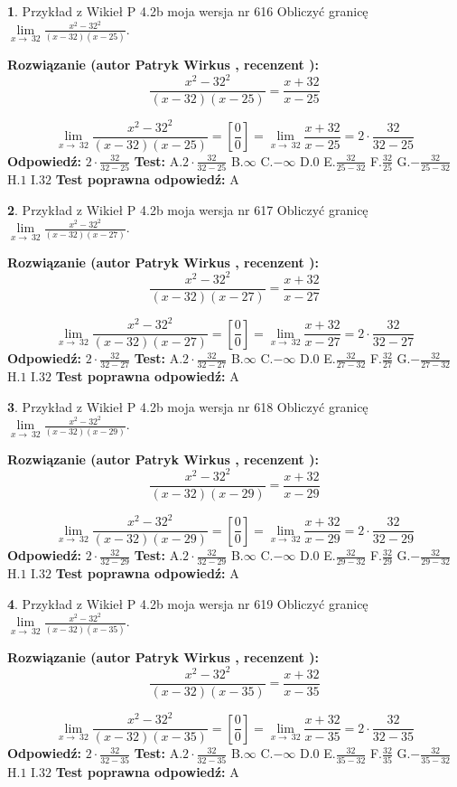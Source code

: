 \documentclass[12pt, a4paper]{article}
\theoremstyle{definition} %
\newtheorem{zad}{}
\newcommand{\zadStart}[1]{\begin{zad}#1\newline}
\newcommand{\zadStop}{\end{zad}}
\newcommand{\rozwStart}[2]{\noindent \textbf{Rozwiązanie (autor #1 , recenzent #2): }\newline}
\newcommand{\rozwStop}{\newline}
\newcommand{\odpStart}{\noindent \textbf{Odpowiedź:}\newline}
\newcommand{\odpStop}{\newline}
\newcommand{\testStart}{\noindent \textbf{Test:}\newline}
\newcommand{\testStop}{\newline}
\newcommand{\kluczStart}{\noindent \textbf{Test poprawna odpowiedź:}\newline}
\newcommand{\kluczStop}{\newline}
\begin{document}
\zadStart{Przykład z Wikieł P 4.2b moja wersja nr 616}
Obliczyć granicę $\lim\limits_{x\to\ 32}\frac{x^{2}-32^{2}}{(x-32)(x-25)}$.
\zadStop
\rozwStart{Patryk Wirkus}{}
$$\frac{x^{2}-32^{2}}{(x-32)(x-25)}=\frac{x+32}{x-25}$$

$$\lim\limits_{x\to\ 32}\frac{x^{2}-32^{2}}{(x-32)(x-25)}=[\frac{0}{0}]=\lim\limits_{x\to\ 32}\frac{x+32}{x-25}=2 \cdot \frac{32}{32-25}$$
\rozwStop
\odpStart
$2 \cdot \frac{32}{32-25}$
\odpStop
\testStart
A.$2 \cdot \frac{32}{32-25}$
B.$\infty$
C.$-\infty$
D.$0$
E.$\frac{32}{25-32}$
F.$\frac{32}{25}$
G.$-\frac{32}{25-32}$
H.$1$
I.$32$
\testStop
\kluczStart
A
\kluczStop



\zadStart{Przykład z Wikieł P 4.2b moja wersja nr 617}
Obliczyć granicę $\lim\limits_{x\to\ 32}\frac{x^{2}-32^{2}}{(x-32)(x-27)}$.
\zadStop
\rozwStart{Patryk Wirkus}{}
$$\frac{x^{2}-32^{2}}{(x-32)(x-27)}=\frac{x+32}{x-27}$$

$$\lim\limits_{x\to\ 32}\frac{x^{2}-32^{2}}{(x-32)(x-27)}=[\frac{0}{0}]=\lim\limits_{x\to\ 32}\frac{x+32}{x-27}=2 \cdot \frac{32}{32-27}$$
\rozwStop
\odpStart
$2 \cdot \frac{32}{32-27}$
\odpStop
\testStart
A.$2 \cdot \frac{32}{32-27}$
B.$\infty$
C.$-\infty$
D.$0$
E.$\frac{32}{27-32}$
F.$\frac{32}{27}$
G.$-\frac{32}{27-32}$
H.$1$
I.$32$
\testStop
\kluczStart
A
\kluczStop



\zadStart{Przykład z Wikieł P 4.2b moja wersja nr 618}
Obliczyć granicę $\lim\limits_{x\to\ 32}\frac{x^{2}-32^{2}}{(x-32)(x-29)}$.
\zadStop
\rozwStart{Patryk Wirkus}{}
$$\frac{x^{2}-32^{2}}{(x-32)(x-29)}=\frac{x+32}{x-29}$$

$$\lim\limits_{x\to\ 32}\frac{x^{2}-32^{2}}{(x-32)(x-29)}=[\frac{0}{0}]=\lim\limits_{x\to\ 32}\frac{x+32}{x-29}=2 \cdot \frac{32}{32-29}$$
\rozwStop
\odpStart
$2 \cdot \frac{32}{32-29}$
\odpStop
\testStart
A.$2 \cdot \frac{32}{32-29}$
B.$\infty$
C.$-\infty$
D.$0$
E.$\frac{32}{29-32}$
F.$\frac{32}{29}$
G.$-\frac{32}{29-32}$
H.$1$
I.$32$
\testStop
\kluczStart
A
\kluczStop



\zadStart{Przykład z Wikieł P 4.2b moja wersja nr 619}
Obliczyć granicę $\lim\limits_{x\to\ 32}\frac{x^{2}-32^{2}}{(x-32)(x-35)}$.
\zadStop
\rozwStart{Patryk Wirkus}{}
$$\frac{x^{2}-32^{2}}{(x-32)(x-35)}=\frac{x+32}{x-35}$$

$$\lim\limits_{x\to\ 32}\frac{x^{2}-32^{2}}{(x-32)(x-35)}=[\frac{0}{0}]=\lim\limits_{x\to\ 32}\frac{x+32}{x-35}=2 \cdot \frac{32}{32-35}$$
\rozwStop
\odpStart
$2 \cdot \frac{32}{32-35}$
\odpStop
\testStart
A.$2 \cdot \frac{32}{32-35}$
B.$\infty$
C.$-\infty$
D.$0$
E.$\frac{32}{35-32}$
F.$\frac{32}{35}$
G.$-\frac{32}{35-32}$
H.$1$
I.$32$
\testStop
\kluczStart
A
\kluczStop
\end{document}
